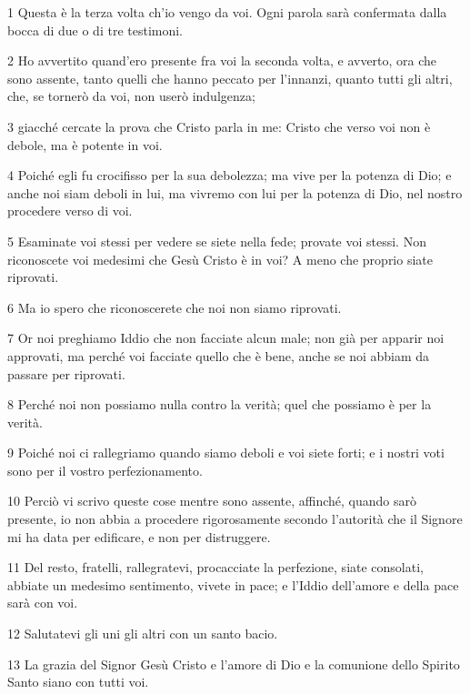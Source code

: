 \par 1 Questa è la terza volta ch'io vengo da voi. Ogni parola sarà confermata dalla bocca di due o di tre testimoni.
\par 2 Ho avvertito quand'ero presente fra voi la seconda volta, e avverto, ora che sono assente, tanto quelli che hanno peccato per l'innanzi, quanto tutti gli altri, che, se tornerò da voi, non userò indulgenza;
\par 3 giacché cercate la prova che Cristo parla in me: Cristo che verso voi non è debole, ma è potente in voi.
\par 4 Poiché egli fu crocifisso per la sua debolezza; ma vive per la potenza di Dio; e anche noi siam deboli in lui, ma vivremo con lui per la potenza di Dio, nel nostro procedere verso di voi.
\par 5 Esaminate voi stessi per vedere se siete nella fede; provate voi stessi. Non riconoscete voi medesimi che Gesù Cristo è in voi? A meno che proprio siate riprovati.
\par 6 Ma io spero che riconoscerete che noi non siamo riprovati.
\par 7 Or noi preghiamo Iddio che non facciate alcun male; non già per apparir noi approvati, ma perché voi facciate quello che è bene, anche se noi abbiam da passare per riprovati.
\par 8 Perché noi non possiamo nulla contro la verità; quel che possiamo è per la verità.
\par 9 Poiché noi ci rallegriamo quando siamo deboli e voi siete forti; e i nostri voti sono per il vostro perfezionamento.
\par 10 Perciò vi scrivo queste cose mentre sono assente, affinché, quando sarò presente, io non abbia a procedere rigorosamente secondo l'autorità che il Signore mi ha data per edificare, e non per distruggere.
\par 11 Del resto, fratelli, rallegratevi, procacciate la perfezione, siate consolati, abbiate un medesimo sentimento, vivete in pace; e l'Iddio dell'amore e della pace sarà con voi.
\par 12 Salutatevi gli uni gli altri con un santo bacio.
\par 13 La grazia del Signor Gesù Cristo e l'amore di Dio e la comunione dello Spirito Santo siano con tutti voi.


